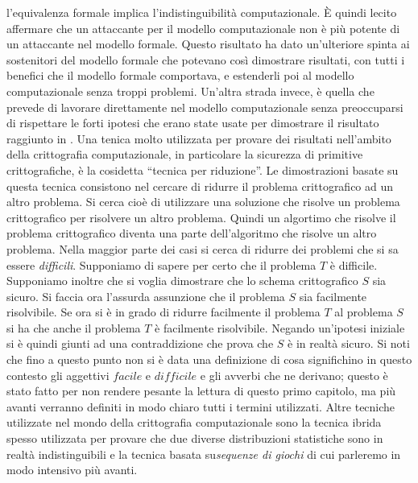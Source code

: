 \documentclass[a4paper,openright,twoside,12pt]{report}
\begin{document}
l'equivalenza formale implica l'indistinguibilit\`a computazionale.
\`E quindi lecito affermare che un attaccante per il modello computazionale non \`e pi\`u potente di un attaccante nel modello formale. Questo risultato ha dato un'ulteriore spinta
ai sostenitori del modello formale che potevano cos\`i dimostrare risultati, con tutti i benefici che il modello formale comportava, 
e estenderli poi al modello computazionale senza troppi problemi.
Un'altra strada invece, \`e quella che prevede di lavorare direttamente nel modello computazionale senza preoccuparsi di rispettare le forti ipotesi che erano 
state usate per dimostrare il risultato raggiunto in \cite{DBLP:journals/joc/AbadiR07}.
Una tenica molto utilizzata per provare dei risultati nell'ambito della crittografia computazionale, in particolare
la sicurezza di primitive crittografiche, \`e la cosidetta ``tecnica per riduzione''. 
Le dimostrazioni basate su questa tecnica consistono nel cercare di ridurre il problema crittografico ad
un altro problema. Si cerca cio\`e di utilizzare una soluzione che risolve un problema crittografico
per risolvere un altro problema. Quindi un algortimo che risolve il problema crittografico diventa
una parte dell'algoritmo che risolve un altro problema.
Nella maggior parte dei casi si cerca di ridurre dei problemi che si sa essere \emph{difficili}. 
Supponiamo di sapere per certo che il problema $T$ \`e difficile. 
Supponiamo inoltre che si voglia dimostrare che lo schema crittografico $S$
sia sicuro. Si faccia ora l'assurda assunzione che il problema $S$ sia facilmente risolvibile. 
Se ora si \`e in grado di ridurre facilmente il problema $T$ al problema $S$ si ha che anche il problema $T$ \`e facilmente risolvibile.
Negando un'ipotesi iniziale si \`e quindi giunti ad una contraddizione che prova che $S$ \`e in realt\`a sicuro.
Si noti che fino a questo punto non si \`e data una definizione di cosa significhino in questo contesto gli aggettivi $facile$ e $difficile$ e gli avverbi che ne derivano; 
questo \`e stato fatto per non rendere pesante la lettura di questo primo capitolo, ma pi\`u avanti verranno definiti
in modo chiaro tutti i termini utilizzati.
Altre tecniche utilizzate nel mondo della crittografia computazionale sono la tecnica ibrida spesso utilizzata
per provare che due diverse distribuzioni statistiche sono in realt\`a indistinguibili e la tecnica basata su\emph{sequenze di giochi} di cui parleremo
in modo intensivo pi\`u avanti.
\end{document}
